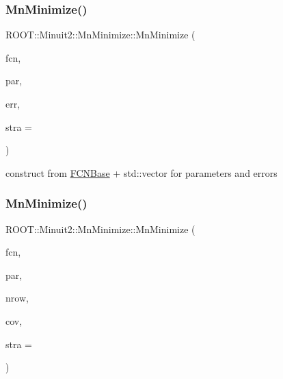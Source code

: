 \subsubsection{\texorpdfstring{MnMinimize()}{MnMinimize()}\hspace{0.1cm}{\footnotesize\ttfamily [27/39]}}
{\footnotesize\ttfamily R\+O\+O\+T\+::\+Minuit2\+::\+Mn\+Minimize\+::\+Mn\+Minimize (\begin{DoxyParamCaption}\item[{const \mbox{\hyperlink{classROOT_1_1Minuit2_1_1FCNBase}{F\+C\+N\+Base}} \&}]{fcn,  }\item[{const std\+::vector$<$ double $>$ \&}]{par,  }\item[{const std\+::vector$<$ double $>$ \&}]{err,  }\item[{unsigned int}]{stra = {} }\end{DoxyParamCaption})\hspace{0.3cm}{\ttfamily [inline]}}



construct from \mbox{\hyperlink{classROOT_1_1Minuit2_1_1FCNBase}{F\+C\+N\+Base}} + std\+::vector for parameters and errors 

\mbox{\label{classROOT_1_1Minuit2_1_1MnMinimize_ad6015768309e01c6610185006008b2d5}} 
\subsubsection{\texorpdfstring{MnMinimize()}{MnMinimize()}\hspace{0.1cm}{\footnotesize\ttfamily [28/39]}}
{\footnotesize\ttfamily R\+O\+O\+T\+::\+Minuit2\+::\+Mn\+Minimize\+::\+Mn\+Minimize (\begin{DoxyParamCaption}\item[{const \mbox{\hyperlink{classROOT_1_1Minuit2_1_1FCNBase}{F\+C\+N\+Base}} \&}]{fcn,  }\item[{const std\+::vector$<$ double $>$ \&}]{par,  }\item[{unsigned int}]{nrow,  }\item[{const std\+::vector$<$ double $>$ \&}]{cov,  }\item[{unsigned int}]{stra = {} }\end{DoxyParamCaption})\hspace{0.3cm}{\ttfamily [inline]}}



